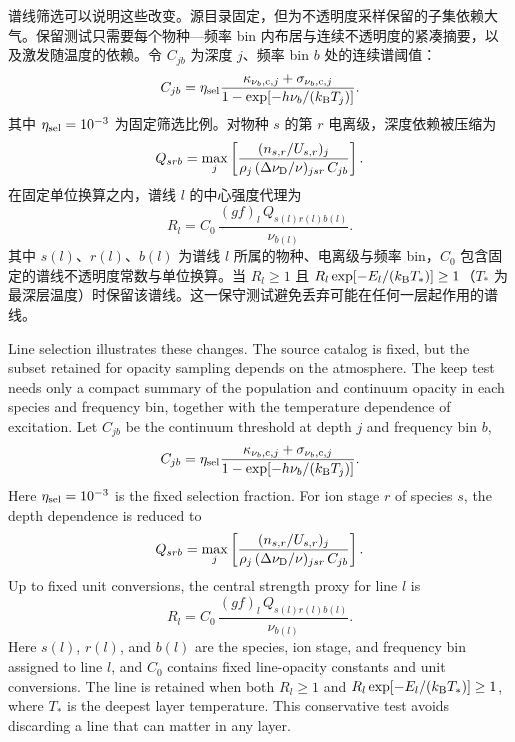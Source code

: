 谱线筛选可以说明这些改变。源目录固定，但为不透明度采样保留的子集依赖大气。保留测试只需要每个物种—频率 bin 内布居与连续不透明度的紧凑摘要，以及激发随温度的依赖。令 $C_{jb}$ 为深度 $j$、频率 bin $b$ 处的连续谱阈值：
\begin{equation}
C_{jb}=\eta_{\rm sel}
\frac{\kappa_{\nu_b,{\rm c},j}+\sigma_{\nu_b,{\rm c},j}}
{1-\exp[-h\nu_b/(k_{\rm B}T_j)]}.
\end{equation}
\noindent 其中 $\eta_{\rm sel}=10^{-3}$ 为固定筛选比例。对物种 $s$ 的第 $r$ 电离级，深度依赖被压缩为
\begin{equation}
Q_{srb} =
\max_j\left[
\frac{(n_{s,r}/U_{s,r})_j}
{\rho_j\,(\Delta\nu_{\rm D}/\nu)_{jsr}\,C_{jb}}
\right] .
\end{equation}
\noindent 在固定单位换算之内，谱线 $l$ 的中心强度代理为
\begin{equation}
R_l=C_0\,\frac{(gf)_l\,Q_{s(l)r(l)b(l)}}{\nu_{b(l)}} .
\end{equation}
\noindent 其中 $s(l)$、$r(l)$、$b(l)$ 为谱线 $l$ 所属的物种、电离级与频率 bin，$C_0$ 包含固定的谱线不透明度常数与单位换算。当 $R_l\geq 1$ 且 $R_l\exp[-E_l/(k_{\rm B}T_*)]\geq 1$（$T_*$ 为最深层温度）时保留该谱线。这一保守测试避免丢弃可能在任何一层起作用的谱线。

\begin{EN}
Line selection illustrates these changes. The source catalog is fixed, but the
subset retained for opacity sampling depends on the atmosphere. The keep test
needs only a compact summary of the population and continuum opacity in each
species and frequency bin, together with the temperature dependence of
excitation. Let $C_{jb}$ be the continuum threshold at depth $j$ and frequency
bin $b$,
\begin{equation}
C_{jb}=\eta_{\rm sel}
\frac{\kappa_{\nu_b,{\rm c},j}+\sigma_{\nu_b,{\rm c},j}}
{1-\exp[-h\nu_b/(k_{\rm B}T_j)]}.
\end{equation}
\noindent Here $\eta_{\rm sel}=10^{-3}$ is the fixed selection fraction. For ion stage
$r$ of species $s$, the depth dependence is reduced to
\begin{equation}
Q_{srb} =
\max_j\left[
\frac{(n_{s,r}/U_{s,r})_j}
{\rho_j\,(\Delta\nu_{\rm D}/\nu)_{jsr}\,C_{jb}}
\right] .
\end{equation}
\noindent Up to fixed unit conversions, the central strength proxy for line $l$ is
\begin{equation}
R_l=C_0\,\frac{(gf)_l\,Q_{s(l)r(l)b(l)}}{\nu_{b(l)}} .
\end{equation}
\noindent Here $s(l)$, $r(l)$, and $b(l)$ are the species, ion stage, and
frequency bin assigned to line $l$, and $C_0$ contains fixed line-opacity
constants and unit conversions.
The line is retained when both $R_l\geq 1$ and
$R_l\exp[-E_l/(k_{\rm B}T_*)]\geq 1$, where $T_*$ is the deepest layer temperature.
This conservative test avoids discarding a line that can matter in any layer.
\end{EN}

